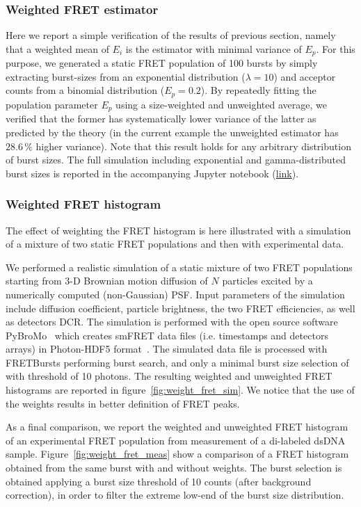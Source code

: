 \subsubsection{Weighted FRET estimator}
Here we report a simple verification of the results of previous section, namely
that a weighted mean of $E_i$ is the estimator with minimal variance of $E_p$.
For this purpose, we generated a static FRET population of 100 bursts 
by simply extracting burst-sizes from an exponential distribution ($\lambda = 10$)
and acceptor counts from a binomial distribution ($E_p = 0.2$). 
By repeatedly fitting the population parameter $E_p$ using a 
size-weighted and unweighted average, we verified that the former has systematically
lower variance of the latter as predicted by the theory
(in the current example the unweighted estimator has $28.6\,\%$ higher variance). 
Note that this result
holds for any arbitrary distribution of burst sizes. The full simulation 
including exponential and gamma-distributed burst sizes is reported in
the accompanying Jupyter notebook (\href{http://nbviewer.jupyter.org/github/tritemio/fretbursts_paper/blob/master/notebooks/Figures%20-%20Burst%20Weights.ipynb}{link}).

\subsubsection{Weighted FRET histogram}
The effect of weighting the FRET histogram is here illustrated with a simulation of
a mixture of two static FRET populations and then with experimental data.

We performed a realistic simulation of a static mixture of two FRET populations
starting from 3-D Brownian motion diffusion of $N$ particles excited by a 
numerically computed (non-Gaussian) PSF. Input parameters of the simulation include
diffusion coefficient, particle brightness, the two FRET efficiencies,
as well as detectors DCR. The simulation is performed with the open source software 
PyBroMo~\cite{Ingargiola_2016} which creates smFRET data files (i.e. timestamps 
and detectors arrays) in Photon-HDF5 format~\cite{Ingargiola2016}.
The simulated data file is processed with FRETBursts performing burst search, 
and only a minimal burst size selection of with threshold of 10 photons.
The resulting weighted and unweighted FRET histograms are reported in figure~\ref{fig:weight_fret_sim}.
We notice that the use of the weights results in better definition of FRET peaks.

As a final comparison, we report the weighted and unweighted FRET histogram of 
an experimental FRET population from measurement of a di-labeled dsDNA sample.
Figure~\ref{fig:weight_fret_meas} show a comparison of a FRET histogram obtained from the same burst
with and without weights. The burst selection is obtained applying a burst size
threshold of 10 counts (after background correction), in order to filter 
the extreme low-end of the burst size distribution.

